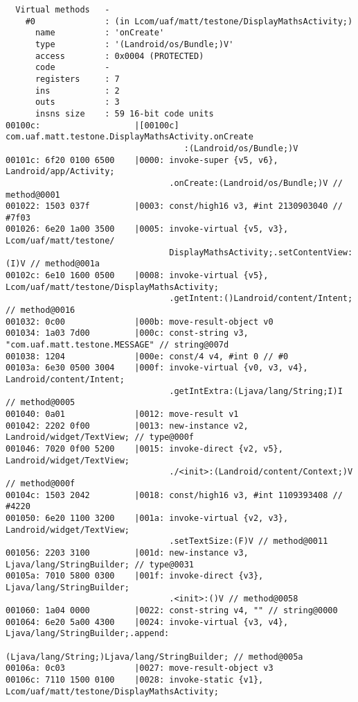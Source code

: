 \begin{lstlisting}
  Virtual methods   -
    #0              : (in Lcom/uaf/matt/testone/DisplayMathsActivity;)
      name          : 'onCreate'
      type          : '(Landroid/os/Bundle;)V'
      access        : 0x0004 (PROTECTED)
      code          -
      registers     : 7
      ins           : 2
      outs          : 3
      insns size    : 59 16-bit code units
00100c:                   |[00100c] com.uaf.matt.testone.DisplayMathsActivity.onCreate
                                    :(Landroid/os/Bundle;)V
00101c: 6f20 0100 6500    |0000: invoke-super {v5, v6}, Landroid/app/Activity;
                                 .onCreate:(Landroid/os/Bundle;)V // method@0001
001022: 1503 037f         |0003: const/high16 v3, #int 2130903040 // #7f03
001026: 6e20 1a00 3500    |0005: invoke-virtual {v5, v3}, Lcom/uaf/matt/testone/
                                 DisplayMathsActivity;.setContentView:(I)V // method@001a
00102c: 6e10 1600 0500    |0008: invoke-virtual {v5}, Lcom/uaf/matt/testone/DisplayMathsActivity;
                                 .getIntent:()Landroid/content/Intent; // method@0016
001032: 0c00              |000b: move-result-object v0
001034: 1a03 7d00         |000c: const-string v3, "com.uaf.matt.testone.MESSAGE" // string@007d
001038: 1204              |000e: const/4 v4, #int 0 // #0
00103a: 6e30 0500 3004    |000f: invoke-virtual {v0, v3, v4}, Landroid/content/Intent;
                                 .getIntExtra:(Ljava/lang/String;I)I // method@0005
001040: 0a01              |0012: move-result v1
001042: 2202 0f00         |0013: new-instance v2, Landroid/widget/TextView; // type@000f
001046: 7020 0f00 5200    |0015: invoke-direct {v2, v5}, Landroid/widget/TextView;
                                 ./<init>:(Landroid/content/Context;)V // method@000f
00104c: 1503 2042         |0018: const/high16 v3, #int 1109393408 // #4220
001050: 6e20 1100 3200    |001a: invoke-virtual {v2, v3}, Landroid/widget/TextView;
                                 .setTextSize:(F)V // method@0011
001056: 2203 3100         |001d: new-instance v3, Ljava/lang/StringBuilder; // type@0031
00105a: 7010 5800 0300    |001f: invoke-direct {v3}, Ljava/lang/StringBuilder;
                                 .<init>:()V // method@0058
001060: 1a04 0000         |0022: const-string v4, "" // string@0000
001064: 6e20 5a00 4300    |0024: invoke-virtual {v3, v4}, Ljava/lang/StringBuilder;.append:
                                 (Ljava/lang/String;)Ljava/lang/StringBuilder; // method@005a
00106a: 0c03              |0027: move-result-object v3
00106c: 7110 1500 0100    |0028: invoke-static {v1}, Lcom/uaf/matt/testone/DisplayMathsActivity;

\end{lstlisting}

